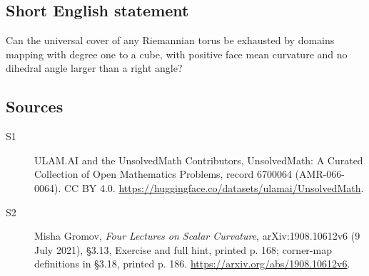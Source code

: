 \documentclass[11pt]{article}
\begin{document}
\subsection{Short English statement}
Can the universal cover of any Riemannian torus be exhausted by domains mapping with degree one to a cube, with positive face mean curvature and no dihedral angle larger than a right angle?
\subsection{Sources}
\begin{description}
\item[\hypertarget{source:6700064:1}{S1}] ULAM.AI and the UnsolvedMath Contributors, UnsolvedMath: A Curated Collection of Open Mathematics Problems, record 6700064 (AMR-066-0064). CC BY 4.0. \url{https://huggingface.co/datasets/ulamai/UnsolvedMath}.
\item[\hypertarget{source:6700064:2}{S2}] Misha Gromov, \emph{Four Lectures on Scalar Curvature}, arXiv:1908.10612v6 (9 July 2021), \S3.13, Exercise and full hint, printed p. 168; corner-map definitions in \S3.18, printed p. 186. \url{https://arxiv.org/abs/1908.10612v6}.
\end{description}
\label{end:6700064}
\end{document}
